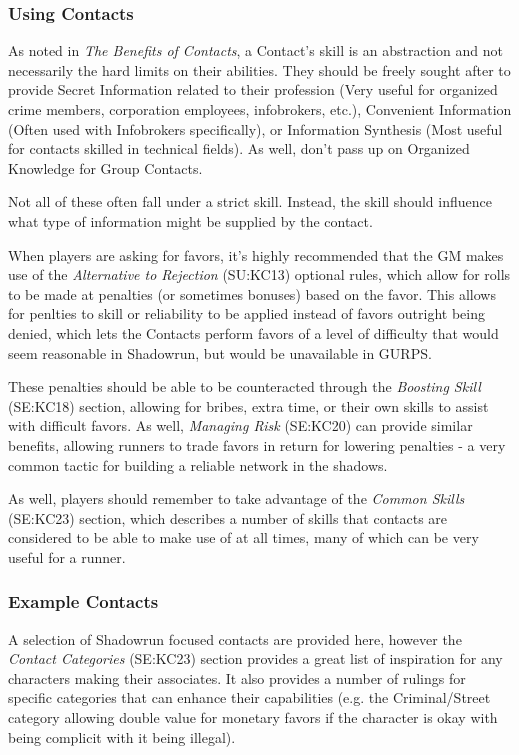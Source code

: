 \begin{multicols*}{2}
	\subsubsection{Using Contacts}
	
	As noted in \textit{The Benefits of Contacts}, a Contact's skill is an abstraction and not necessarily the hard limits on their abilities. They should be freely sought after to provide Secret Information related to their profession (Very useful for organized crime members, corporation employees, infobrokers, etc.), Convenient Information (Often used with Infobrokers specifically), or Information Synthesis (Most useful for contacts skilled in technical fields). As well, don't pass up on Organized Knowledge for Group Contacts.
	
	Not all of these often fall under a strict skill. Instead, the skill should influence what type of information might be supplied by the contact.
	
	When players are asking for favors, it's highly recommended that the GM makes use of the \textit{Alternative to Rejection} (SU:KC13) optional rules, which allow for rolls to be made at penalties (or sometimes bonuses) based on the favor. This allows for penlties to skill or reliability to be applied instead of favors outright being denied, which lets the Contacts perform favors of a level of difficulty that would seem reasonable in Shadowrun, but would be unavailable in GURPS.
	
	These penalties should be able to be counteracted through the \textit{Boosting Skill} (SE:KC18) section, allowing for bribes, extra time, or their own skills to assist with difficult favors. As well, \textit{Managing Risk} (SE:KC20) can provide similar benefits, allowing runners to trade favors in return for lowering penalties - a very common tactic for building a reliable network in the shadows.
	
	As well, players should remember to take advantage of the \textit{Common Skills} (SE:KC23) section, which describes a number of skills that contacts are considered to be able to make use of at all times, many of which can be very useful for a runner.
	
	\subsubsection{Example Contacts}
	
	A selection of Shadowrun focused contacts are provided here, however the \textit{Contact Categories} (SE:KC23) section provides a great list of inspiration for any characters making their associates. It also provides a number of rulings for specific categories that can enhance their capabilities (e.g. the Criminal/Street category allowing double value for monetary favors if the character is okay with being complicit with it being illegal).\\
	

\end{multicols*}
